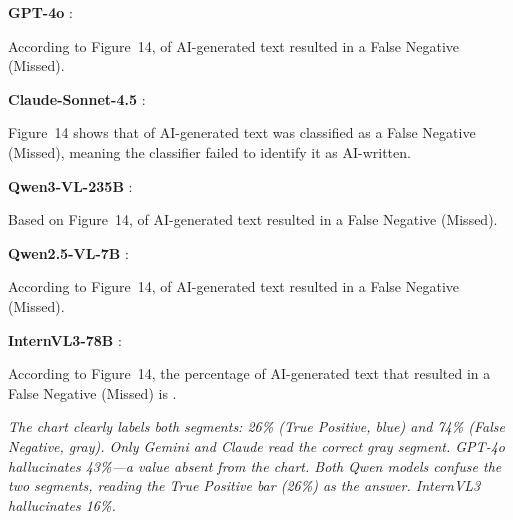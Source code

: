 \documentclass{article} %
\begin{document}
\noindent\textbf{GPT-4o} :
\begin{tcolorbox}[enhanced,breakable,colback=red!5,colframe=red!30,boxrule=0.4pt,arc=2pt,left=6pt,right=6pt,top=2pt,bottom=2pt]
\footnotesize
According to Figure~14,  of AI-generated text resulted in a False Negative (Missed).
\end{tcolorbox}

\noindent\textbf{Claude-Sonnet-4.5} :
\begin{tcolorbox}[enhanced,breakable,colback=lbgreen!15,colframe=lbgreen!60,boxrule=0.4pt,arc=2pt,left=6pt,right=6pt,top=2pt,bottom=2pt]
\footnotesize
Figure~14 shows that  of AI-generated text was classified as a False Negative (Missed),
meaning the classifier failed to identify it as AI-written.
\end{tcolorbox}

\noindent\textbf{Qwen3-VL-235B} :
\begin{tcolorbox}[enhanced,breakable,colback=red!5,colframe=red!30,boxrule=0.4pt,arc=2pt,left=6pt,right=6pt,top=2pt,bottom=2pt]
\footnotesize
Based on Figure~14,  of AI-generated text resulted in a False Negative (Missed).
\end{tcolorbox}

\noindent\textbf{Qwen2.5-VL-7B} :
\begin{tcolorbox}[enhanced,breakable,colback=red!5,colframe=red!30,boxrule=0.4pt,arc=2pt,left=6pt,right=6pt,top=2pt,bottom=2pt]
\footnotesize
According to Figure~14,  of AI-generated text resulted in a False Negative (Missed).
\end{tcolorbox}

\noindent\textbf{InternVL3-78B} :
\begin{tcolorbox}[enhanced,breakable,colback=red!5,colframe=red!30,boxrule=0.4pt,arc=2pt,left=6pt,right=6pt,top=2pt,bottom=2pt]
\footnotesize
According to Figure~14, the percentage of AI-generated text that resulted in a
False Negative (Missed) is .
\end{tcolorbox}

\noindent\textit{The chart clearly labels both segments: 26\% (True Positive, blue) and 74\% (False Negative, gray). Only Gemini and Claude read the correct gray segment. GPT-4o hallucinates 43\%---a value absent from the chart. Both Qwen models confuse the two segments, reading the True Positive bar (26\%) as the answer. InternVL3 hallucinates 16\%.}

\clearpage
\end{document}
